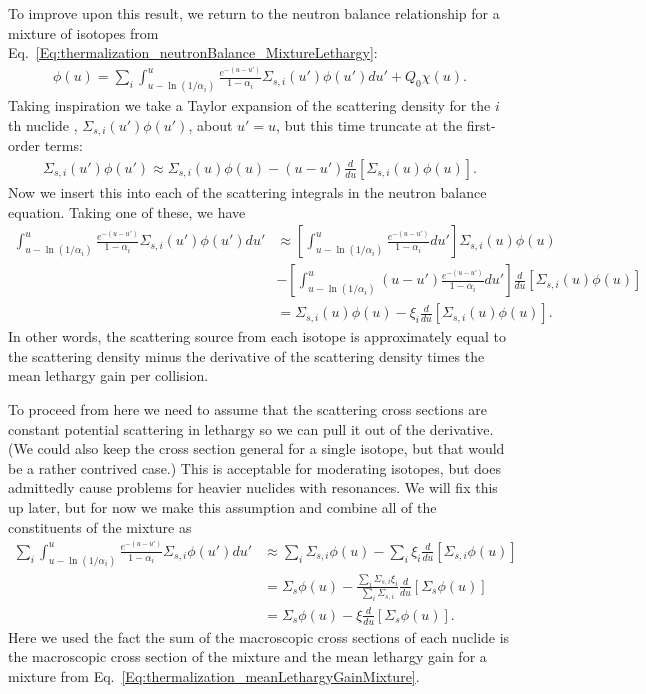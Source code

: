 To improve upon this result, we return to the neutron balance relationship for a mixture of isotopes from Eq.~\eqref{Eq:thermalization_neutronBalance_MixtureLethargy}:
\begin{align}
  [ B^2 D(u) + \Sigma_t(u) ] \phi(u) = \sum_i \int_{u-\ln(1/\alpha_i)}^u \frac{e^{-(u-u')}}{1 - \alpha_i} \Sigma_{s,i}(u') \phi(u') du' + Q_0 \chi(u) . \nonumber
\end{align}
Taking inspiration we take a Taylor expansion of the scattering density for the $i$th nuclide , $\Sigma_{s,i}(u')\phi(u')$, about $u' = u$, but this time truncate at the first-order terms:
\begin{align}
  \Sigma_{s,i}(u') \phi(u') \approx \Sigma_{s,i}(u) \phi(u) - ( u - u' ) \frac{d}{du} [ \Sigma_{s,i}(u) \phi(u) ] .
\end{align}
Now we insert this into each of the scattering integrals in the neutron balance equation. Taking one of these, we have
\begin{align}
  \int_{u-\ln(1/\alpha_i)}^u \frac{e^{-(u-u')}}{1 - \alpha_i} \Sigma_{s,i}(u') \phi(u') du'
  &\approx \left[ \int_{u-\ln(1/\alpha_i)}^u \frac{e^{-(u-u')}}{1 - \alpha_i} du' \right] \Sigma_{s,i}(u) \phi(u) \nonumber \\
  &- \left[ \int_{u-\ln(1/\alpha_i)}^u (u - u') \frac{e^{-(u-u')}}{1 - \alpha_i} du' \right]  \frac{d}{du} [ \Sigma_{s,i}(u) \phi(u) ] \nonumber \\
  &= \Sigma_{s,i}(u) \phi(u) - \xi_i \frac{d}{du} [ \Sigma_{s,i}(u) \phi(u) ] .
\end{align}
In other words, the scattering source from each isotope is approximately equal to the scattering density minus the derivative of the scattering density times the mean lethargy gain per collision.

To proceed from here we need to assume that the scattering cross sections are constant potential scattering in lethargy so we can pull it out of the derivative. (We could also keep the cross section general for a single isotope, but that would be a rather contrived case.) This is acceptable for moderating isotopes, but does admittedly cause problems for heavier nuclides with resonances. We will fix this up later, but for now we make this assumption and combine all of the constituents of the mixture as
\begin{align}
  \sum_i \int_{u-\ln(1/\alpha_i)}^u \frac{e^{-(u-u')}}{1 - \alpha_i} \Sigma_{s,i} \phi(u') du'
  &\approx  \sum_i \Sigma_{s,i} \phi(u) - \sum_i \xi_i \frac{d}{du} [ \Sigma_{s,i} \phi(u) ] \nonumber \\
  &= \Sigma_s \phi(u) - \frac{ \sum_i \Sigma_{s,i} \xi_i }{ \sum_i \Sigma_{s,i} } \frac{d}{du} [ \Sigma_s \phi(u) ]  \nonumber \\
  &= \Sigma_s \phi(u) - \xi \frac{d}{du} [ \Sigma_s \phi(u) ] .
\end{align}
Here we used the fact the sum of the macroscopic cross sections of each nuclide is the macroscopic cross section of the mixture and the mean lethargy gain for a mixture from Eq.~\eqref{Eq:thermalization_meanLethargyGainMixture}.

